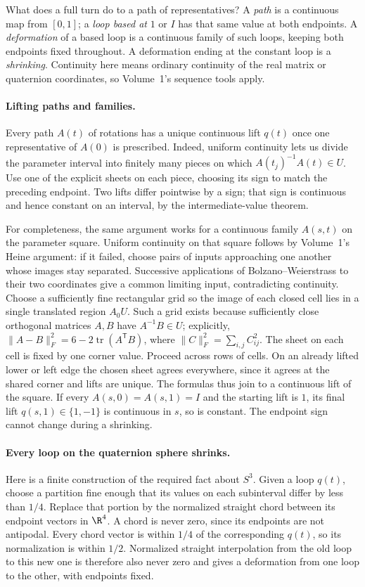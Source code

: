 What does a full turn do to a path of representatives?
A \emph{path} is a continuous map from $[0,1]$; a \emph{loop based at}
$1$ or $I$ has that same value at both endpoints.
A \emph{deformation} of a based loop is a continuous family of such loops,
keeping both endpoints fixed throughout. A deformation ending at the constant
loop is a \emph{shrinking}.
Continuity here means ordinary continuity of the real matrix or quaternion
coordinates, so Volume~1's sequence tools apply.

\paragraph{Lifting paths and families.}
Every path $A(t)$ of rotations has a unique continuous lift $q(t)$ once
one representative of $A(0)$ is prescribed. Indeed, uniform continuity lets
us divide the parameter interval into finitely many pieces on which
$A(t_j)^{-1}A(t)\in U$. Use one of the explicit sheets on each piece,
choosing its sign to match the preceding endpoint.
Two lifts differ pointwise by a sign; that sign is continuous and hence
constant on an interval, by the intermediate-value theorem.

For completeness, the same argument works for a continuous family $A(s,t)$
on the parameter square. Uniform continuity on that square follows by
Volume~1's Heine argument: if it failed, choose pairs of inputs approaching
one another whose images stay separated. Successive applications of
Bolzano--Weierstrass to their two coordinates give a common limiting input,
contradicting continuity. Choose a sufficiently fine rectangular grid so
the image of each closed cell lies in a single translated region $A_0U$.
Such a grid exists because sufficiently close orthogonal matrices $A,B$
have $A^{-1}B\in U$; explicitly,
$\|A-B\|_F^2=6-2\operatorname{tr}(A^{\mathsf T}B)$, where
$\|C\|_F^2=\sum_{i,j}C_{ij}^2$.
The sheet on each cell is fixed by one corner value. Proceed across rows
of cells. On an already lifted lower or left edge the chosen sheet agrees
everywhere, since it agrees at the shared corner and lifts are unique.
The formulas thus join to a continuous lift of the square.
If every $A(s,0)=A(s,1)=I$ and the starting lift is $1$, its final lift
$q(s,1)\in\{1,-1\}$ is continuous in $s$, so is constant.
The endpoint sign cannot change during a shrinking.

\paragraph{Every loop on the quaternion sphere shrinks.}
Here is a finite construction of the required fact about $S^3$.
Given a loop $q(t)$, choose a partition fine enough that its values on
each subinterval differ by less than $1/4$.
Replace that portion by the normalized straight chord between its endpoint
vectors in $\R^4$. A chord is never zero, since its endpoints are not
antipodal. Every chord vector is within $1/4$ of the corresponding $q(t)$,
so its normalization is within $1/2$.
Normalized straight interpolation from the old loop to this new one is
therefore also never zero and gives a deformation from one loop to the other,
with endpoints fixed.

